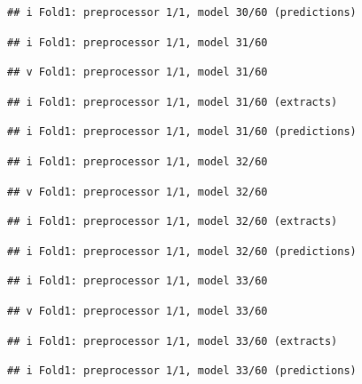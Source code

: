 \documentclass[
]{article}
\begin{document}
\begin{verbatim}
## i Fold1: preprocessor 1/1, model 30/60 (predictions)
\end{verbatim}

\begin{verbatim}
## i Fold1: preprocessor 1/1, model 31/60
\end{verbatim}

\begin{verbatim}
## v Fold1: preprocessor 1/1, model 31/60
\end{verbatim}

\begin{verbatim}
## i Fold1: preprocessor 1/1, model 31/60 (extracts)
\end{verbatim}

\begin{verbatim}
## i Fold1: preprocessor 1/1, model 31/60 (predictions)
\end{verbatim}

\begin{verbatim}
## i Fold1: preprocessor 1/1, model 32/60
\end{verbatim}

\begin{verbatim}
## v Fold1: preprocessor 1/1, model 32/60
\end{verbatim}

\begin{verbatim}
## i Fold1: preprocessor 1/1, model 32/60 (extracts)
\end{verbatim}

\begin{verbatim}
## i Fold1: preprocessor 1/1, model 32/60 (predictions)
\end{verbatim}

\begin{verbatim}
## i Fold1: preprocessor 1/1, model 33/60
\end{verbatim}

\begin{verbatim}
## v Fold1: preprocessor 1/1, model 33/60
\end{verbatim}

\begin{verbatim}
## i Fold1: preprocessor 1/1, model 33/60 (extracts)
\end{verbatim}

\begin{verbatim}
## i Fold1: preprocessor 1/1, model 33/60 (predictions)
\end{verbatim}
\end{document}

